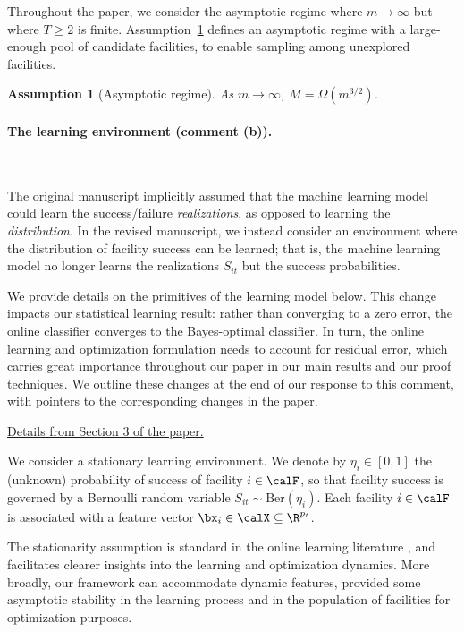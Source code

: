 \documentclass[11pt]{article}
\newtheorem{assumption}{Assumption}[]
\begin{document}
Throughout the paper, we consider the asymptotic regime where $m\to\infty$ but where $T\geq2$ is finite. Assumption~\ref{ass:regime_AE} defines an asymptotic regime with a large-enough pool of candidate facilities, to enable sampling among unexplored facilities.
\setcounter{assumption}{0}
\begin{assumption}[Asymptotic regime]
    \label{ass:regime_AE}
   As $m \to \infty$, $M=\Omega(m^{3/2})$.
\end{assumption}

\paragraph{The learning environment (comment (b)).}\

The original manuscript implicitly assumed that the machine learning model could learn the success/failure \textit{realizations}, as opposed to learning the \textit{distribution}. In the revised manuscript, we instead consider an environment where the distribution of facility success can be learned; that is, the machine learning model no longer learns the realizations $S_{it}$ but the success probabilities.

We provide details on the primitives of the learning model below. This change impacts our statistical learning result: rather than converging to a zero error, the online classifier converges to the Bayes-optimal classifier. In turn, the online learning and optimization formulation needs to account for residual error, which carries great importance throughout our paper in our main results and our proof techniques. We outline these changes at the end of our response to this comment, with pointers to the corresponding changes in the paper.

\underline{Details from Section 3 of the paper.}

We consider a stationary learning environment. We denote by $\eta_{i} \in [0,1]$ the (unknown) probability of success of facility $i\in\calF$, so that facility success is governed by a Bernoulli random variable $S_{it}\sim \text{Ber}(\eta_{i})$. Each facility $i\in\calF$ is associated with a feature vector $\bx_{i} \in \calX\subseteq\R^{p_t}$.

The stationarity assumption is standard in the online learning literature \citep[e.g.,][]{auer2002using, agrawal2012analysis}, and facilitates clearer insights into the learning and optimization dynamics. More broadly, our framework can accommodate dynamic features, provided some asymptotic stability in the learning process and in the population of facilities for optimization purposes.
\end{document}
